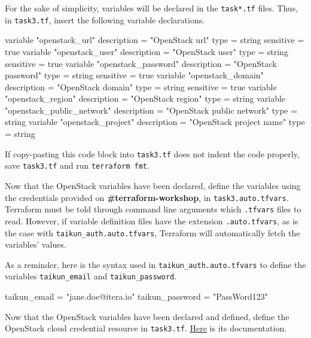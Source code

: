 For the sake of simplicity, variables will be declared in the \texttt{task*.tf} files.
Thus, in \texttt{task3.tf}, insert the following variable declarations.
\begin{tf}
variable "openstack_url" {
  description = "OpenStack url"
  type        = string
  sensitive   = true
}
variable "openstack_user" {
  description = "OpenStack user"
  type        = string
  sensitive   = true
}
variable "openstack_password" {
  description = "OpenStack password"
  type        = string
  sensitive   = true
}
variable "openstack_domain" {
  description = "OpenStack domain"
  type        = string
  sensitive   = true
}
variable "openstack_region" {
  description = "OpenStack region"
  type        = string
}
variable "openstack_public_network" {
  description = "OpenStack public network"
  type        = string
}
variable "openstack_project" {
  description = "OpenStack project name"
  type        = string
}
\end{tf}
\begin{note}
  If copy-pasting this code block into \texttt{task3.tf} does not indent the code properly,
  save \texttt{task3.tf} and run \texttt{terraform fmt}.
\end{note}

Now that the OpenStack variables have been declared,
define the variables using the credentials provided on \textbf{\#terraform-workshop}, in \texttt{task3.auto.tfvars}.\\

Terraform must be told through command line arguments which \texttt{.tfvars} files to read.
However, if variable definition files have the extension \texttt{.auto.tfvars}, as is the case with
\texttt{taikun\_auth.auto.tfvars}, Terraform will automatically fetch the variables' values.
\begin{tip}
As a reminder, here is the syntax used in \texttt{taikun\_auth.auto.tfvars} to define the variables \texttt{taikun\_email}
and \texttt{taikun\_password}.
\begin{tf}
taikun_email = "jane.doe@itera.io"
taikun_password = "PassWord123"
\end{tf}
\end{tip}

Now that the OpenStack variables have been declared and defined, define the OpenStack cloud credential resource in \texttt{task3.tf}.
\href{https://registry.terraform.io/providers/itera-io/taikun/latest/docs/resources/cloud_credential_openstack}{Here} is its documentation.

